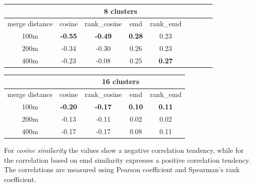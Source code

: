 	\begin{table}[!ht]
		{\begin{tabular}{ | c | c | c | c | c | c | c | c | c |}
				\hline
				{} & \multicolumn{4}{c|}{8 clusters} \\ \hline
				{merge distance} & cosine & rank\_cosine & emd & rank\_emd \\ \hline
				100m & \textbf{-0.55} & \textbf{-0.49} & \textbf{0.28} & 0.23 \\ \hline
				200m & -0.34 & -0.30 & 0.26	& 0.23 \\ \hline
				400m & -0.23 & -0.08 & 0.25 & \textbf{0.27} \\ \hline
		\end{tabular}}
		\vspace{3em}
		{\begin{tabular}{ | c | c | c | c | c | }
				\hline
				{} & \multicolumn{4}{c|}{16 clusters} \\ \hline
				{merge distance} & cosine & rank\_cosine & emd & rank\_emd \\ \hline
				100m & \textbf{-0.20} & \textbf{-0.17} & \textbf{0.10} & \textbf{0.11} \\ \hline
				200m & -0.13 & -0.11 & 0.02 & 0.02 \\ \hline
				400m & -0.17 & -0.17 & 0.08 & 0.11 \\ \hline
		\end{tabular}}
		\label{tab:similarity_vs_estimation}
		\begin{tabnote}
			For \textit{cosine similarity} the values show a negative correlation tendency, while for the correlation based on emd similarity expresses a positive correlation tendency. The correlations are measured using Pearson coefficient and Spearman's rank coefficient.
		\end{tabnote}
	\end{table}
				
